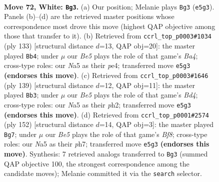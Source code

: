 \documentclass[11pt]{article}
\begin{document}
\clearpage

\begin{figure}[p]\centering
\begin{subfigure}{0.46\textwidth}\centering
\resizebox{\linewidth}{!}{%
\newchessgame
\chessboard[
  setfen={6k1/2P5/8/N1r1B3/8/8/4K3/8 w - - 57 72},
  showmover=false,
  pgfstyle=straightmove, color=movearrow, markmove={e5-g3}
]}
\caption{}
\end{subfigure}\hfill
\begin{subfigure}{0.46\textwidth}\centering
\resizebox{\linewidth}{!}{%
\newchessgame
\chessboard[
  setfen={8/5k2/8/b1R5/4P3/8/3p4/3K4 b - - 9 67},
  showmover=false,
  pgfstyle=straightmove, color=movearrow, markmove={a5-b4}
]}
\caption{}
\end{subfigure}
\\[4pt]
\begin{subfigure}{0.46\textwidth}\centering
\resizebox{\linewidth}{!}{%
\newchessgame
\chessboard[
  setfen={8/7k/3R4/3b4/8/8/p6P/K7 b - - 3 70},
  showmover=false,
  pgfstyle=straightmove, color=movearrow, markmove={d5-b3}
]}
\caption{}
\end{subfigure}\hfill
\begin{subfigure}{0.46\textwidth}\centering
\resizebox{\linewidth}{!}{%
\newchessgame
\chessboard[
  setfen={5B2/7p/r6P/5k2/3K4/8/8/8 w - - 13 77},
  showmover=false,
  pgfstyle=straightmove, color=movearrow, markmove={f8-g7}
]}
\caption{}
\end{subfigure}
\caption{\textbf{Move 72, White: \texttt{Bg3}.} (a) Our position; Melanie plays \texttt{Bg3} (\texttt{e5g3}). Panels (b)--(d) are the retrieved master positions whose correspondence most drove this move (highest QAP objective among those that transfer to it). (b) Retrieved from \texttt{ccrl\_top\_p0003\#1034} (ply 133) [structural distance $d$=13, QAP obj=20]: the master played \texttt{Bb4}; under $\mu$ our \emph{Be5} plays the role of that game's \emph{Ba4}; cross-type roles: our \emph{N}a5 as their \emph{p}e4; transferred move \texttt{e5g3} \textbf{(endorses this move)}. (c) Retrieved from \texttt{ccrl\_top\_p0003\#1646} (ply 139) [structural distance $d$=12, QAP obj=11]: the master played \texttt{Bb3}; under $\mu$ our \emph{Be5} plays the role of that game's \emph{Bd4}; cross-type roles: our \emph{N}a5 as their \emph{p}h2; transferred move \texttt{e5g3} \textbf{(endorses this move)}. (d) Retrieved from \texttt{ccrl\_top\_p0001\#2574} (ply 152) [structural distance $d$=14, QAP obj=3]: the master played \texttt{Bg7}; under $\mu$ our \emph{Be5} plays the role of that game's \emph{Bf8}; cross-type roles: our \emph{N}a5 as their \emph{p}h7; transferred move \texttt{e5g3} \textbf{(endorses this move)}. Synthesis: 7 retrieved analogs transferred to \texttt{Bg3} (summed QAP objective 100, the strongest correspondence among the candidate moves); Melanie committed it via the \texttt{search} selector.}
\label{fig:thought-m142}
\end{figure}
\end{document}
